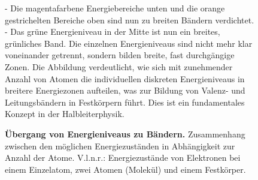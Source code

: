 {\begin{figure}[H]
{    - Die magentafarbene Energiebereiche unten und die orange gestrichelten Bereiche oben sind nun zu breiten Bändern verdichtet.  
    - Das grüne Energieniveau in der Mitte ist nun ein breites, grünliches Band.  
    Die einzelnen Energieniveaus sind nicht mehr klar voneinander getrennt, sondern bilden breite, fast durchgängige Zonen.  
    Die Abbildung verdeutlicht, wie sich mit zunehmender Anzahl von Atomen die individuellen diskreten Energieniveaus in breitere Energiezonen aufteilen, was zur Bildung von Valenz- und Leitungsbändern in Festkörpern führt. Dies ist ein fundamentales Konzept in der Halbleiterphysik.}
    \caption{\textbf{Übergang von Energieniveaus zu Bändern.} Zusammenhang zwischen den möglichen 
    Energiezuständen in Abhängigkeit zur Anzahl der Atome. V.l.n.r.: Energiezustände von Elektronen 
    bei einem Einzelatom, zwei Atomen (Molekül) und einem Festkörper.}  
    \label{fig:UebergangVonEnergieniveausZuBaendern}
\end{figure}
}
%


